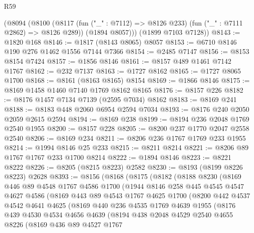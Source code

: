\begin{lexlean}{R59}
\begin{coremodule}
      (@8094
        (@8100
          (@8117 (fun ("_" : @7112) => @8126 @233) (fun ("_" : @7111 @2862) => @8126 @289))
          (@1894 @8057)))
      (@1899 @7103 @7128))
@8143 := @1820 @168
@8146 := @1817 (@8143 @8065) @8057
@8153 := @6710 @8146 @190 @276 @1462 @1556 @7144 @7366
@8154 := @2485 @7147
@8156 := @8153 @8154 @7424
@8157 := @1856 @8146
@8161 := @8157 @489 @1461 @7142 @1767
@8162 := @232 @7137
@8163 := @1727 @8162
@8165 := @1727 @8065 @1700
@8168 := @8161 (@8163 @8165) @8154
@8169 := @1866 @8146
@8175 := @8169 @1458 @1460 @7140 @1769 @8162 @8165
@8176 := @8157 @226
@8182 := @8176 @1457 @7134 @7139 (@2595 @7034) @8162
@8183 := @8169 @241
@8188 := @8183 @448 @2060 @6954 @2594 @7034
@8193 := @8176 @240 @2050 @2059 @2615 @2594
@8194 := @8169 @238
@8199 := @8194 @236 @2048 @1769 @2540 @1955
@8200 := @8157 @228
@8205 := @8200 @237 @1770 @2047 @2558 @2540
@8206 := @8169 @234
@8211 := @8206 @236 @1767 @1769 @233 @1955
@8214 := @1994 @8146 @25 @233
@8215 := @8211 @8214
@8221 := @8206 @89 @1767 @1767 @233 @1700 @8214
@8222 := @1894 @8146
@8223 := @8221 @8222
@8226 := @8205 (@8215 @8223) @2582
@8230 := @8193 (@8199 @8226 @8223) @2628
@8393 := @8156
    (@8168
      (@8175
        (@8182
          (@8188
            @8230
            (@8169
              @446
              @89
              @4548
              @1767
              @4586
              @1700
              (@1944
                @8146
                @258
                @445
                @4545
                @4547
                @4627
                @4586
                (@8169
                  @443
                  @89
                  @4543
                  @1767
                  @4625
                  @1700
                  (@8200
                    @442
                    @4537
                    @4542
                    @4641
                    @4625
                    (@8169
                      @440
                      @236
                      @4535
                      @1769
                      @4639
                      @1955
                      (@8176
                        @439
                        @4530
                        @4534
                        @4656
                        @4639
                        (@8194
                          @438
                          @2048
                          @4529
                          @2540
                          @4655
                          @8226
                          (@8169
                            @436
                            @89
                            @4527
                            @1767

\end{coremodule}
\end{lexlean}
